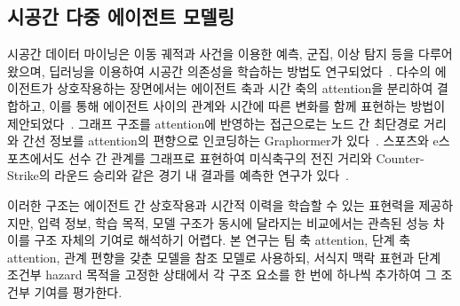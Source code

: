 \subsection{시공간 다중 에이전트 모델링}
\label{sec:related:multiagent}

시공간 데이터 마이닝은 이동 궤적과 사건을 이용한 예측, 군집, 이상 탐지 등을 다루어 왔으며, 딥러닝을 이용하여 시공간 의존성을 학습하는 방법도 연구되었다~\cite{Atluri18,Wang22}.
다수의 에이전트가 상호작용하는 장면에서는 에이전트 축과 시간 축의 attention을 분리하여 결합하고, 이를 통해 에이전트 사이의 관계와 시간에 따른 변화를 함께 표현하는 방법이 제안되었다~\cite{Ngiam22,Capellera24}.
그래프 구조를 attention에 반영하는 접근으로는 노드 간 최단경로 거리와 간선 정보를 attention의 편향으로 인코딩하는 Graphormer가 있다~\cite{Ying21}.
스포츠와 e스포츠에서도 선수 간 관계를 그래프로 표현하여 미식축구의 전진 거리와 Counter-Strike의 라운드 승리와 같은 경기 내 결과를 예측한 연구가 있다~\cite{Xenopoulos21}.

이러한 구조는 에이전트 간 상호작용과 시간적 이력을 학습할 수 있는 표현력을 제공하지만, 입력 정보, 학습 목적, 모델 구조가 동시에 달라지는 비교에서는 관측된 성능 차이를 구조 자체의 기여로 해석하기 어렵다.
본 연구는 팀 축 attention, 단계 축 attention, 관계 편향을 갖춘 모델을 참조 모델로 사용하되, 서식지 맥락 표현과 단계 조건부 hazard 목적을 고정한 상태에서 각 구조 요소를 한 번에 하나씩 추가하여 그 조건부 기여를 평가한다.

